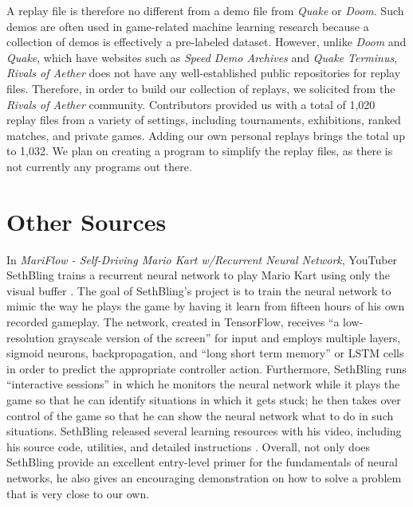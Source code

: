 A replay file is therefore no different from a demo file from {\it Quake} or {\it Doom}. Such demos are often used in game-related machine learning research because a collection of demos is effectively a pre-labeled dataset. However, unlike {\it Doom} and {\it Quake}, which have websites such as {\it Speed Demo Archives} and {\it Quake Terminus}, {\it Rivals of Aether} does not have any well-established public repositories for replay files. Therefore, in order to build our collection of replays, we solicited from the {\it Rivals of Aether} community. Contributors provided us with a total of 1,020 replay files from a variety of settings, including tournaments, exhibitions, ranked matches, and private games. Adding our own personal replays brings the total up to 1,032. We plan on creating a program to simplify the replay files, as there is not currently any programs out there.




\section{Other Sources}

In {\it MariFlow - Self-Driving Mario Kart w/Recurrent Neural Network}, YouTuber SethBling trains a recurrent neural network to play Mario Kart using only the visual buffer \cite{SethBling:2017}. The goal of SethBling's project is to train the neural network to mimic the way he plays the game by having it learn from fifteen hours of his own recorded gameplay. The network, created in TensorFlow, receives ``a low-resolution grayscale version of the screen'' for input and employs multiple layers, sigmoid neurons, backpropagation, and ``long short term memory'' or LSTM cells in order to predict the appropriate controller action. Furthermore, SethBling runs ``interactive sessions'' in which he monitors the neural network while it plays the game so that he can identify situations in which it gets stuck; he then takes over control of the game so that he can show the neural network what to do in such situations. SethBling released several learning resources with his video, including his source code, utilities, and detailed instructions \cite{SethBling:2017}. Overall, not only does SethBling provide an excellent entry-level primer for the fundamentals of neural networks, he also gives an encouraging demonstration on how to solve a problem that is very close to our own.

